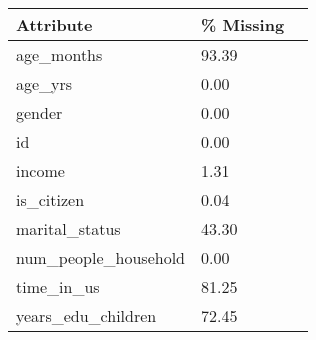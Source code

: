 \begin{tabular}{llr}
\toprule
\textbf{Attribute} &  \textbf{\% Missing} \\
\midrule
age\_months &      93.39 \\
age\_yrs &       0.00 \\
gender &       0.00 \\
id &       0.00 \\
income &       1.31 \\
is\_citizen &       0.04 \\
marital\_status &      43.30 \\
num\_people\_household &       0.00 \\
time\_in\_us &      81.25 \\
years\_edu\_children &      72.45 \\
\bottomrule
\end{tabular}
